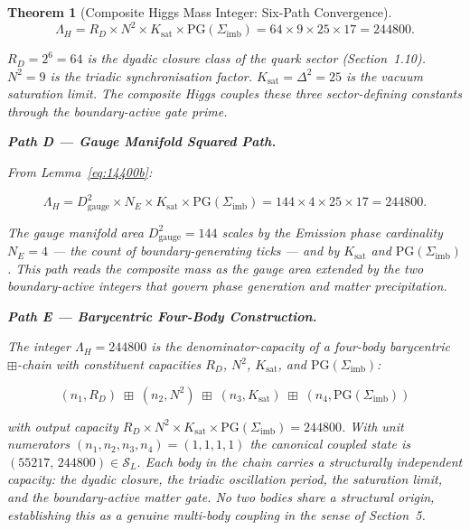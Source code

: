 \documentclass[11pt, letterpaper]{article}
\theoremstyle{definition}
\theoremstyle{plain}
\newtheorem{theorem}{Theorem}[section]
\begin{document}
\begin{theorem}[Composite Higgs Mass Integer: Six-Path Convergence]
\begin{equation}
    \Lambda_H = R_D \times N^2 \times K_\mathrm{sat} \times \mathrm{PG}(\Sigma_\mathrm{imb})
              = 64 \times 9 \times 25 \times 17 = 244800.
\end{equation}

$R_D = 2^6 = 64$ is the dyadic closure class of the quark sector (Section~1.10).
$N^2 = 9$ is the triadic synchronisation factor. $K_\mathrm{sat} = \Delta^2 = 25$ is
the vacuum saturation limit. The composite Higgs couples these three sector-defining
constants through the boundary-active gate prime.

\medskip
\noindent\textbf{Path D — Gauge Manifold Squared Path.}

From Lemma~\ref{eq:14400b}:

\begin{equation}
    \Lambda_H = D_\mathrm{gauge}^2 \times N_E \times K_\mathrm{sat} \times \mathrm{PG}(\Sigma_\mathrm{imb})
              = 144 \times 4 \times 25 \times 17 = 244800.
\end{equation}

The gauge manifold area $D_\mathrm{gauge}^2 = 144$ scales by the Emission phase
cardinality $N_E = 4$ — the count of boundary-generating ticks — and by $K_\mathrm{sat}$
and $\mathrm{PG}(\Sigma_\mathrm{imb})$. This path reads the composite mass as the gauge
area extended by the two boundary-active integers that govern phase generation and matter
precipitation.

\medskip
\noindent\textbf{Path E — Barycentric Four-Body Construction.}

The integer $\Lambda_H = 244800$ is the denominator-capacity of a four-body barycentric
$\boxplus$-chain with constituent capacities $R_D$, $N^2$, $K_\mathrm{sat}$, and
$\mathrm{PG}(\Sigma_\mathrm{imb})$:

\begin{equation}
    (n_1, R_D) \;\boxplus\; (n_2, N^2) \;\boxplus\; (n_3, K_\mathrm{sat}) \;\boxplus\;
    (n_4, \mathrm{PG}(\Sigma_\mathrm{imb}))
\end{equation}

with output capacity $R_D \times N^2 \times K_\mathrm{sat} \times \mathrm{PG}(\Sigma_\mathrm{imb})
= 244800$. With unit numerators $(n_1, n_2, n_3, n_4) = (1,1,1,1)$ the canonical
coupled state is $(55217,\,244800) \in \mathcal{S}_L$. Each body in the chain carries a
structurally independent capacity: the dyadic closure, the triadic oscillation period, the
saturation limit, and the boundary-active matter gate. No two bodies share a structural
origin, establishing this as a genuine multi-body coupling in the sense of Section~5.


\end{theorem}
\end{document}
